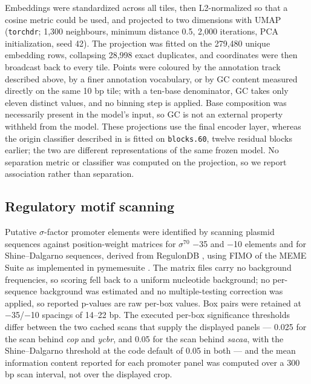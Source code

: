 Embeddings were standardized across all tiles, then L2-normalized so that a
cosine metric could be used, and projected to two dimensions with UMAP
\cite{mcinnes2018umap,vanassel2025torchdr}
(\texttt{torchdr}; 1,300 neighbours, minimum distance 0.5, 2,000 iterations,
PCA initialization, seed 42). The projection was fitted on the 279,480 unique
embedding rows, collapsing 28,998 exact duplicates, and coordinates were then
broadcast back to every tile. Points were coloured by the annotation track
described above, by a finer annotation vocabulary, or by GC content measured
directly on the same 10 bp tile; with a ten-base denominator, GC takes only
eleven distinct values, and no binning step is applied. Base composition was
necessarily present in the model's input, so GC is not an external property
withheld from the model. These projections use the final encoder layer,
whereas the origin classifier described in  is fitted on
\texttt{blocks.60}, twelve residual blocks earlier; the two are different
representations of the same frozen model. No separation metric or classifier
was computed on the projection, so we report association rather than
separation.

\subsection*{Regulatory motif scanning}

Putative $\sigma$-factor promoter elements were identified by scanning plasmid
sequences against position-weight matrices for $\sigma^{70}$ $-$35 and $-$10
elements and for Shine--Dalgarno sequences, derived from RegulonDB
\cite{salgado2024regulondb}, using FIMO \cite{grant2011fimo} of the MEME
Suite \cite{bailey2015meme} as implemented in pymemesuite
\cite{larralde2022pymemesuite}.
The matrix files carry no background frequencies, so scoring fell back to a
uniform nucleotide background; no per-sequence background was estimated and
no multiple-testing correction was applied, so reported p-values are raw
per-box values. Box pairs were retained at $-$35/$-$10 spacings of 14--22 bp.
The executed per-box significance thresholds differ between the two cached
scans that supply the displayed panels --- 0.025 for the scan behind
\emph{cop} and \emph{ycbr}, and 0.05 for the scan behind \emph{sacaa}, with
the Shine--Dalgarno threshold at the code default of 0.05 in both --- and the
mean information content reported for each promoter panel was computed
over a 300 bp scan interval, not over the displayed crop.


